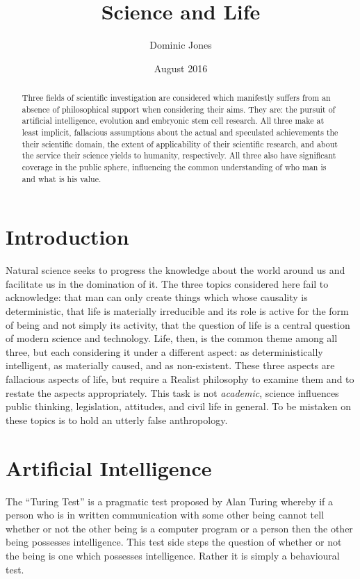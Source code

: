 \documentclass{article}
\title{Science and Life}
\author{Dominic Jones}
\date{August 2016}
\begin{document}
\maketitle

\begin{abstract}
Three fields of scientific investigation are considered which manifestly suffers from an absence of philosophical support when considering their aims. They are: the pursuit of artificial intelligence, evolution and embryonic stem cell research. All three make at least implicit, fallacious assumptions about the actual and speculated achievements the their scientific domain, the extent of applicability of their scientific research, and about the service their science yields to humanity, respectively. All three also have significant coverage in the public sphere, influencing the common understanding of who man is and what is his value.
\end{abstract}

\section*{Introduction}
Natural science seeks to progress the knowledge about the world around us and facilitate us in the domination of it. The three topics considered here fail to acknowledge: that man can only create things which whose causality is deterministic, that life is materially irreducible and its role is active for the form of being and not simply its activity, that the question of life is a central question of modern science and technology. Life, then, is the common theme among all three, but each considering it under a different aspect: as deterministically intelligent, as materially caused, and as non-existent. These three aspects are fallacious aspects of life, but require a Realist philosophy to examine them and to restate the aspects appropriately. This task is not \emph{academic}, science influences public thinking, legislation, attitudes, and civil life in general. To be mistaken on these topics is to hold an utterly false anthropology.

\section*{Artificial Intelligence}
The ``Turing Test'' is a pragmatic test proposed by Alan Turing whereby if a person who is in written communication with some other being cannot tell whether or not the other being is a computer program or a person then the other being possesses intelligence. This test side steps the question of whether or not the being is one which possesses intelligence. Rather it is simply a behavioural test.
\end{document}
